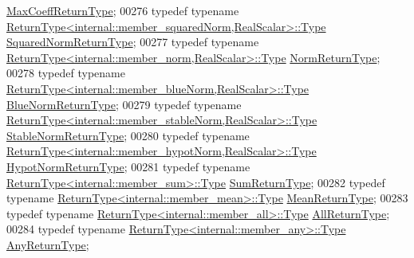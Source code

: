 \begin{DoxyCode}
       \hyperlink{group___core___module_class_eigen_1_1_partial_redux_expr}{MaxCoeffReturnType};
00276     \textcolor{keyword}{typedef} \textcolor{keyword}{typename} \hyperlink{group___core___module_class_eigen_1_1_partial_redux_expr}{ReturnType<internal::member\_squaredNorm,RealScalar>::Type}
       \hyperlink{group___core___module_class_eigen_1_1_partial_redux_expr}{SquaredNormReturnType};
00277     \textcolor{keyword}{typedef} \textcolor{keyword}{typename} \hyperlink{group___core___module_class_eigen_1_1_partial_redux_expr}{ReturnType<internal::member\_norm,RealScalar>::Type}
       \hyperlink{group___core___module_class_eigen_1_1_partial_redux_expr}{NormReturnType};
00278     \textcolor{keyword}{typedef} \textcolor{keyword}{typename} \hyperlink{group___core___module_class_eigen_1_1_partial_redux_expr}{ReturnType<internal::member\_blueNorm,RealScalar>::Type}
       \hyperlink{group___core___module_class_eigen_1_1_partial_redux_expr}{BlueNormReturnType};
00279     \textcolor{keyword}{typedef} \textcolor{keyword}{typename} \hyperlink{group___core___module_class_eigen_1_1_partial_redux_expr}{ReturnType<internal::member\_stableNorm,RealScalar>::Type}
       \hyperlink{group___core___module_class_eigen_1_1_partial_redux_expr}{StableNormReturnType};
00280     \textcolor{keyword}{typedef} \textcolor{keyword}{typename} \hyperlink{group___core___module_class_eigen_1_1_partial_redux_expr}{ReturnType<internal::member\_hypotNorm,RealScalar>::Type}
       \hyperlink{group___core___module_class_eigen_1_1_partial_redux_expr}{HypotNormReturnType};
00281     \textcolor{keyword}{typedef} \textcolor{keyword}{typename} \hyperlink{group___core___module_class_eigen_1_1_partial_redux_expr}{ReturnType<internal::member\_sum>::Type} 
      \hyperlink{group___core___module_class_eigen_1_1_partial_redux_expr}{SumReturnType};
00282     \textcolor{keyword}{typedef} \textcolor{keyword}{typename} \hyperlink{group___core___module_class_eigen_1_1_partial_redux_expr}{ReturnType<internal::member\_mean>::Type} 
      \hyperlink{group___core___module_class_eigen_1_1_partial_redux_expr}{MeanReturnType};
00283     \textcolor{keyword}{typedef} \textcolor{keyword}{typename} \hyperlink{group___core___module_class_eigen_1_1_partial_redux_expr}{ReturnType<internal::member\_all>::Type} 
      \hyperlink{group___core___module_class_eigen_1_1_partial_redux_expr}{AllReturnType};
00284     \textcolor{keyword}{typedef} \textcolor{keyword}{typename} \hyperlink{group___core___module_class_eigen_1_1_partial_redux_expr}{ReturnType<internal::member\_any>::Type} 
      \hyperlink{group___core___module_class_eigen_1_1_partial_redux_expr}{AnyReturnType};

\end{DoxyCode}
